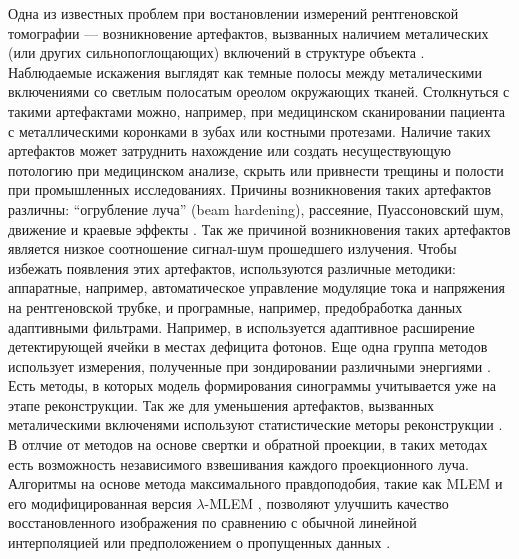 Одна из известных проблем при востановлении измерений рентгеновской томографии --- возникновение артефактов, вызванных наличием металических (или других сильнопоглощающих) включений в структуре объекта \cite{barrett2004artifacts, boas2012ct, nasirudin2015reduction, park2015computed}.
Наблюдаемые искажения выглядят как темные полосы между металическими включениями со светлым полосатым ореолом окружающих тканей.
Столкнуться с такими артефактами можно, например, при медицинском сканировании пациента с металлическими коронками в зубах или костными протезами.
Наличие таких артефактов может затруднить нахождение или создать несуществующую потологию при медицинском анализе, скрыть или привнести трещины и полости при промышленных исследованиях.
Причины возникновения таких артефактов различны: ``огрубление луча'' (beam hardening), рассеяние, Пуассоновский шум, движение и краевые эффекты \cite{boas2012ct}.
Так же причиной возникновения таких артефактов является низкое соотношение сигнал-шум прошедшего излучения.
Чтобы избежать появления этих артефактов, используются различные методики: аппаратные, например, автоматическое управление модуляцие тока и напряжения на рентгеновской трубке, и програмные, например, предобработка данных адаптивными фильтрами.
Например, в \cite{boas2012ct} используется адаптивное расширение детектирующей ячейки в местах дефицита фотонов.
Еще одна группа методов использует измерения, полученные при зондировании различными энергиями \cite{bamberg2011metal}.
Есть методы, в которых модель формирования синограммы учитывается уже на этапе реконструкции.
Так же для уменьшения артефактов, вызванных металическими включенями используют статистические меторы реконструкции \cite{jmuller2006, buzug2008computed}.
В отлчие от методов на основе свертки и обратной проекции, в таких методах есть возможность независимого взвешивания каждого проекционного луча.
Алгоритмы на основе метода максимального правдоподобия, такие как MLEM \cite{buzug2008computed} и его модифицированная версия $\lambda$-MLEM \cite{oehler2007statistical}, позволяют улучшить качество восстановленного изображения по сравнению с обычной линейной интерполяцией или предположением о пропущенных данных \cite{amirkhanov2012evaluation}.

